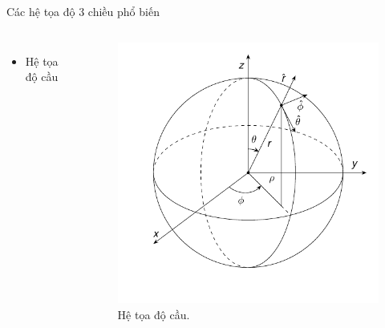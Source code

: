 \begin{frame}{Các hệ tọa độ 3 chiều phổ biến}
\begin{columns}
        \begin{itemize}
            \item Hệ tọa độ cầu
        \end{itemize}
        \begin{figure}
            \centering
            \includegraphics[width=\linewidth]{Figures/Spherical_coordinate.pdf}
            \caption{Hệ tọa độ cầu.}
            \label{fig:Spherical_coordinate}
        \end{figure}

    \end{columns}

\end{frame}

